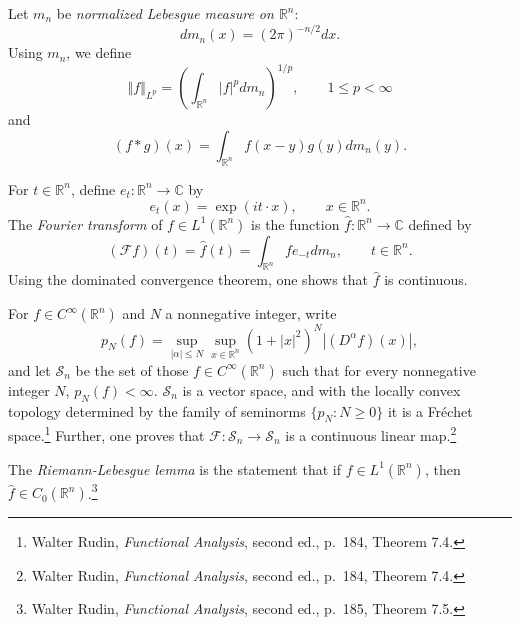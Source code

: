 \documentclass{article}
\newcommand{\norm}[1]{\left\Vert #1 \right\Vert}
\theoremstyle{definition}
\begin{document}
Let $m_n$ be {\em normalized Lebesgue measure on $\mathbb{R}^n$}: 
\[
dm_n(x) = (2\pi)^{-n/2} dx.
\]
Using $m_n$, we define
\[
\norm{f}_{L^p} = \left( \int_{\mathbb{R}^n} |f|^p dm_n\right)^{1/p}, \qquad 1 \leq p < \infty
\]
and 
\[
(f*g)(x) = \int_{\mathbb{R}^n} f(x-y) g(y) dm_n(y).
\]


For $t \in \mathbb{R}^n$, define $e_t:\mathbb{R}^n \to \mathbb{C}$ by
\[
e_t(x) = \exp(it\cdot x), \qquad x \in \mathbb{R}^n.
\]
The {\em Fourier transform} of $f \in L^1(\mathbb{R}^n)$ is the function $\hat{f}:\mathbb{R}^n \to \mathbb{C}$ defined by
\[
(\mathscr{F}f)(t) = \hat{f}(t) = \int_{\mathbb{R}^n} f e_{-t} dm_n, \qquad t \in \mathbb{R}^n.
\]
Using the dominated convergence theorem, one shows that $\hat{f}$ is continuous.






For $f \in C^\infty(\mathbb{R}^n)$ and $N$ a nonnegative integer, write
\[
p_N(f) = \sup_{|\alpha| \leq N} \sup_{x \in \mathbb{R}^n} (1+|x|^2)^N |(D^\alpha f)(x)|,
\]
and let $\mathscr{S}_n$ be the set of those $f \in C^\infty(\mathbb{R}^n)$ such that for every nonnegative integer $N$, $p_N(f)<\infty$.
$\mathscr{S}_n$ is a vector space, and with the locally convex topology determined by the family of seminorms
$\{p_N: N \geq 0\}$ it is a Fr\'echet space.\footnote{Walter Rudin, {\em Functional Analysis}, second ed., p.~184, Theorem 7.4.}
Further, one proves that $\mathscr{F}:\mathscr{S}_n \to \mathscr{S}_n$ is a continuous linear map.\footnote{Walter
Rudin, {\em Functional Analysis}, second ed., p.~184, Theorem 7.4.}

The {\em Riemann-Lebesgue lemma} is the statement that if $f \in L^1(\mathbb{R}^n)$, then $\hat{f} \in C_0(\mathbb{R}^n)$.\footnote{Walter
Rudin, {\em Functional Analysis}, second ed., p.~185, Theorem 7.5.}
\end{document}
